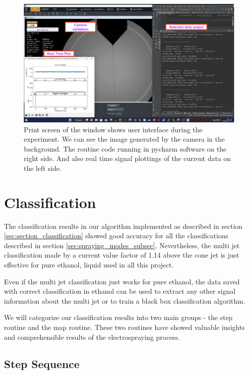 \begin{figure}[H]
    \center
    \includegraphics[width=16cm]{Figuras/19:03/axs1.png}
    \caption{Print screen of the window shows user interface during the experiment.
        We can see the image generated by the camera in the background.
        The routine code running in pycharm software on the right side.
        And also real time signal plottings of the current data on the left side.}
        \label{fig:multi_class_exp1}
\end{figure}


\section{Classification}
\label{sec:classification_results}

The classification results in our algorithm implemented as described in section \ref{sec:section_classification} showed good accuracy for all the classifications described in section \ref{sec:spraying_modes_subsec}.
Nevertheless, the multi jet classification made by a current value factor of 1.14 above the cone jet is just effective for pure ethanol, liquid used in all this project.

Even if the multi jet classification just works for pure ethanol, the data saved with correct classification in ethanol can be used to extract any other signal information about the multi jet or to train a black box classification algorithm.

We will categorize our classification results into two main groups - the step routine and the map routine. These two routines have showed valuable insights and comprehensible results of the electrospraying process.


\subsection{Step Sequence}
\label{subsec:step_results}

